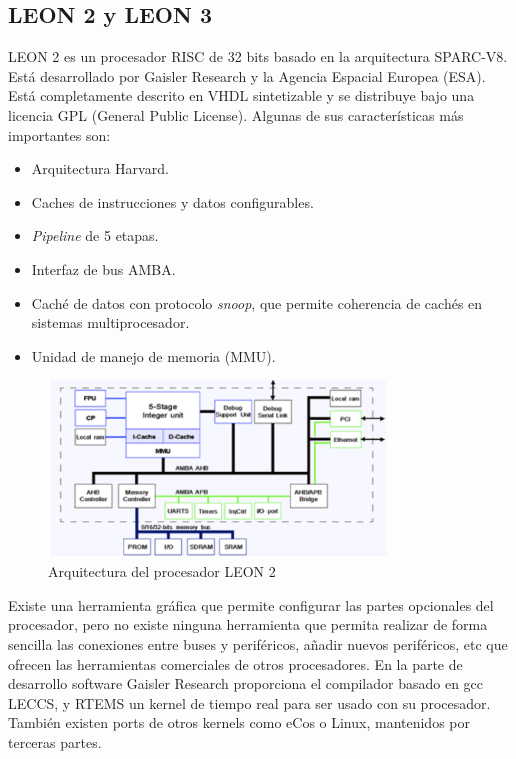    	\subsection{LEON 2 y LEON 3}

LEON 2 es un procesador RISC de 32 bits basado en la arquitectura SPARC-V8\cite{Etiqueta33}. Está desarrollado por Gaisler Research y la Agencia Espacial Europea (ESA). Está completamente descrito en VHDL sintetizable y se distribuye bajo una licencia GPL (General Public License). Algunas de sus características más importantes son:

\begin{itemize}
		 \item  Arquitectura Harvard.
		 \item  Caches de instrucciones y datos configurables.
	       \item \textit{Pipeline} de 5 etapas.
		 \item  Interfaz de bus AMBA.
 		\item  Caché de datos con protocolo \textit{snoop}, que permite coherencia de cachés en sistemas multiprocesador.
		\item Unidad de manejo de memoria (MMU).
		\end{itemize}
	
\begin{figure}[h!]
 	\begin{center}
  	\includegraphics[width=0.8\textwidth,keepaspectratio=true]{./images/leon}
  	\caption{Arquitectura del procesador LEON 2}
 	\end{center}
	\end{figure}

Existe una herramienta gráfica que permite configurar las partes opcionales del procesador, pero no existe ninguna herramienta que permita realizar de forma sencilla las conexiones entre buses y periféricos, añadir nuevos periféricos, etc que ofrecen las herramientas comerciales de otros procesadores. En la parte de desarrollo software Gaisler Research proporciona el compilador basado en gcc LECCS, y RTEMS un kernel de tiempo real para ser usado con su procesador. También existen ports de otros kernels como eCos o Linux, mantenidos por terceras partes.

